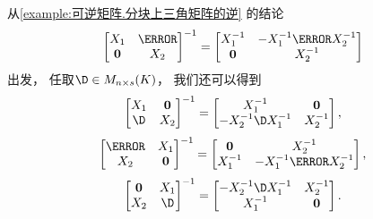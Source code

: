\begin{remark}
从\cref{example:可逆矩阵.分块上三角矩阵的逆} 的结论\[
	\begin{bmatrix}
		\A & \C \\
		\vb0 & \B
	\end{bmatrix}^{-1}
	= \begin{bmatrix}
		\A^{-1} & -\A^{-1} \C \B^{-1} \\
		\vb0 & \B^{-1}
	\end{bmatrix}
\]出发，
任取\(\D \in M_{n \times s}(K)\)，
我们还可以得到\[
	\begin{bmatrix}
		\A & \vb0 \\
		\D & \B
	\end{bmatrix}^{-1}
	= \begin{bmatrix}
		\A^{-1} & \vb0 \\
		-\B^{-1} \D \A^{-1} & \B^{-1}
	\end{bmatrix},
\]\[
	\begin{bmatrix}
		\C & \A \\
		\B & \vb0
	\end{bmatrix}^{-1}
	= \begin{bmatrix}
		\vb0 & \B^{-1} \\
		\A^{-1} & -\A^{-1}\C\B^{-1}
	\end{bmatrix},
\]\[
	\begin{bmatrix}
		\vb0 & \A \\
		\B & \D
	\end{bmatrix}^{-1}
	= \begin{bmatrix}
		-\B^{-1}\D\A^{-1} & \B^{-1} \\
		\A^{-1} & \vb0
	\end{bmatrix}.
\]


\end{remark}
